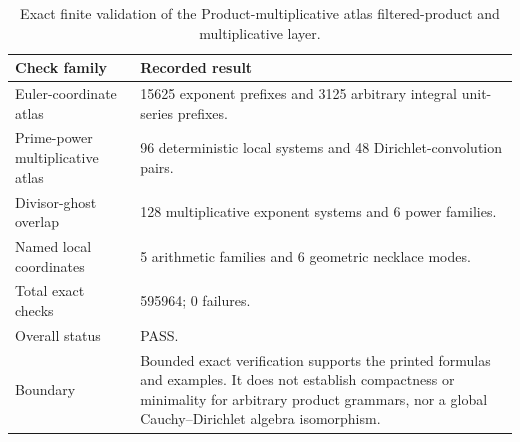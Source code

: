 \begin{table}[htbp]
\centering
\caption{Exact finite validation of the Product-multiplicative atlas filtered-product and multiplicative layer.}
\label{tab:block07-validation}
\small
\begin{tabularx}{\textwidth}{@{}L{0.31\textwidth}Y@{}}
\toprule
Check family & Recorded result\\
\midrule
Euler-coordinate atlas & 15625 exponent prefixes and 3125 arbitrary integral unit-series prefixes.\\
Prime-power multiplicative atlas & 96 deterministic local systems and 48 Dirichlet-convolution pairs.\\
Divisor-ghost overlap & 128 multiplicative exponent systems and 6 power families.\\
Named local coordinates & 5 arithmetic families and 6 geometric necklace modes.\\
Total exact checks & 595964; 0 failures.\\
Overall status & PASS.\\
Boundary & Bounded exact verification supports the printed formulas and examples. It does not establish compactness or minimality for arbitrary product grammars, nor a global Cauchy--Dirichlet algebra isomorphism.\\
\bottomrule
\end{tabularx}
\end{table}
